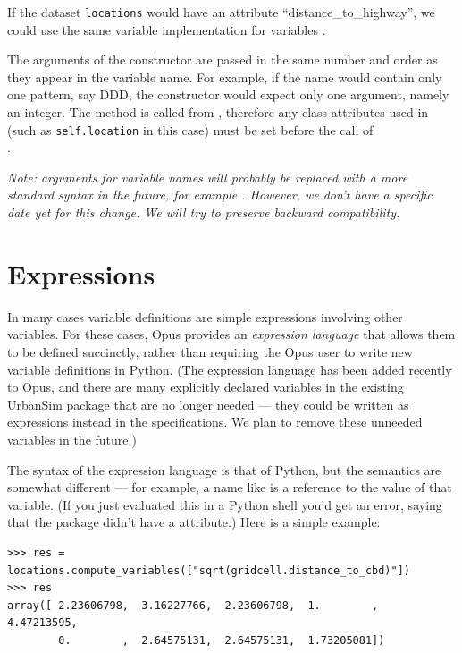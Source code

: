 If the dataset \datasetindex \verb|locations| would have an attribute \attributesindex
``distance_to_highway'', we
could use the same variable \variablesindex implementation for variables \variablesindex
{}.

The arguments of the constructor are passed in the same number and order as
they appear in the variable name. For example, if the name would contain only
one pattern, say DDD, the constructor would expect only one argument, namely
an integer. The method  is called from
, therefore any class attributes used in
 (such as \verb|self.location| in this case) must be set
before the call of \\
.

\emph{Note: arguments for variable names will probably be replaced with a
  more standard syntax in the future, for example
  .  However, we don't have
  a specific date yet for this change.  We will try to preserve backward
  compatibility.}

\section{Expressions}
\label{sec:urbansim-tutorial-expressions}

In many cases variable definitions are simple expressions involving other
variables.  For these cases, Opus provides an \emph{expression language}
that allows them to be defined succinctly, rather than requiring the Opus
user to write new variable definitions in Python.  (The expression language
has been added recently to Opus, and there are many explicitly declared
variables in the existing UrbanSim package that are no longer needed ---
they could be written as expressions instead in the specifications.  We
plan to remove these unneeded variables in the future.)

The syntax of the expression language is that of Python, but the semantics
are somewhat different --- for example, a name like
 is a reference to the value of that
variable.  (If you just evaluated this in a Python shell you'd get an
error, saying that the  package didn't have a
 attribute.)  Here is a simple example:

\begin{verbatim}
>>> res = locations.compute_variables(["sqrt(gridcell.distance_to_cbd)"])
>>> res
array([ 2.23606798,  3.16227766,  2.23606798,  1.        ,  4.47213595,
        0.        ,  2.64575131,  2.64575131,  1.73205081])
\end{verbatim}

